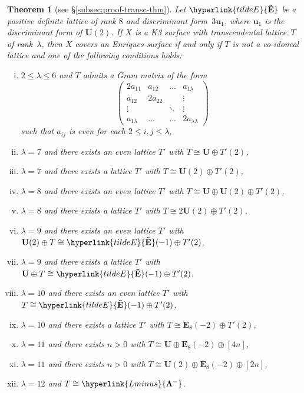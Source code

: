 \documentclass[a4paper]{amsart}
\theoremstyle{definition}
\theoremstyle{plain}
\newtheorem{theorem}[definition]{Theorem}
\newcommand{\bE}{\mathbf{E}}
\newcommand{\bU}{\mathbf{U}}
\newcommand{\bu}{\mathbf{u}}
\newcommand{\bLambda}{\mathbf{\Lambda}}
\newcommand{\Lminus}{\hyperlink{Lminus}{\bLambda^-}}
\newcommand{\Etilde}{\hyperlink{tildeE}{\mathbf{\tilde{E}}}}
\begin{document}
\begin{theorem}[see §\ref{subsec:proof-transc-thm}] \label{thm:transcendental}
Let \(\Etilde\) be a positive definite lattice of rank \(8\) and discriminant form~\(3\bu_1\), where \(\bu_1\) is the discriminant form of \(\bU(2)\).
If \(X\) is a K3 surface with transcendental lattice~\(T\) of rank~\(\lambda\), then \(X\) covers an Enriques surface if and only if \(T\) is not a co-idoneal lattice and
one of the following conditions holds: 
\begin{enumerate}[(i)]
    \item \label{cond:2<=lambda<=6} \(2 \leq \lambda \leq 6\) and \(T\) admits a Gram matrix of the form
    \[
    \begin{pmatrix} 
        2a_{11} & a_{12} & \ldots & a_{1\lambda} \\
        a_{12} & 2a_{22} & & \vdots \\
        \vdots &  & \ddots & \vdots \\
        a_{1\lambda} & \ldots & \ldots & 2a_{\lambda\lambda}
    \end{pmatrix}
    \]
    such that \(a_{ij}\) is even for each \(2 \leq i, j \leq \lambda\),
    \item \(\lambda = 7\) and there exists an even lattice \(T'\) with \(T \cong \bU \oplus T'(2)\),
    \item \(\lambda = 7\) and there exists a lattice \(T'\) with \(T \cong \bU(2) \oplus T'(2)\),
    \item \(\lambda = 8\) and there exists an even lattice \(T'\) with \(T \cong \bU \oplus \bU(2) \oplus T'(2)\),
    \item \(\lambda = 8\) and there exists a lattice \(T'\) with \(T \cong 2\bU(2) \oplus T'(2)\),
    \item \label{cond:lambda=9a} \(\lambda = 9\) and there exists an even lattice \(T'\) with \(\bU(2) \oplus T \cong \Etilde(-1) \oplus T'(2)\),
    \item \(\lambda = 9\) and there exists a lattice \(T'\) with \(\bU \oplus T \cong \Etilde(-1) \oplus T'(2)\).
    \item \label{cond:lambda=10.1} \(\lambda = 10\) and there exists an even lattice \(T'\) with \(T \cong \Etilde(-1) \oplus T'(2)\),
    \item \label{cond:lambda=10.2} \(\lambda = 10\) and there exists a lattice \(T'\) with \(T \cong \bE_8(-2) \oplus T'(2)\),   
    \item \(\lambda = 11\) and there exists \(n > 0\) with \(T \cong \bU \oplus \bE_8(-2) \oplus [4n]\),
    \item \(\lambda = 11\) and there exists \(n > 0\) with \(T \cong \bU(2) \oplus \bE_8(-2) \oplus [2n]\),
    \item \label{cond:lambda=12} \(\lambda = 12\) and \(T \cong \Lminus\).
\end{enumerate}
\end{theorem}
\end{document}
